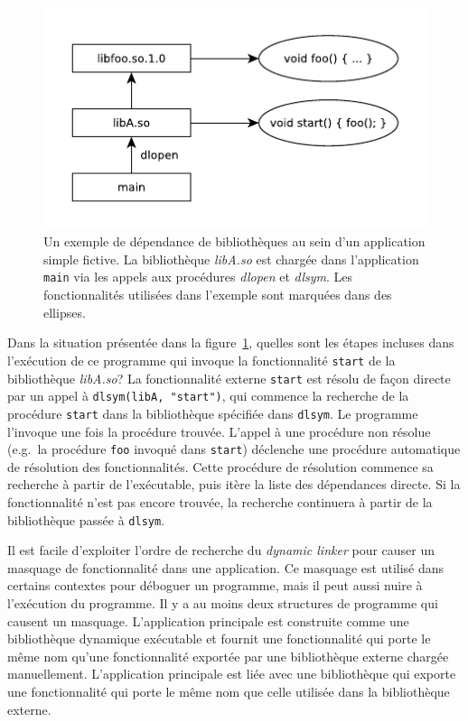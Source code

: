 \begin{center}
    \begin{figure}[ht]
        \includegraphics{figures/libdeps-ex1.pdf}

        \caption{Un exemple de dépendance de bibliothèques au sein d'un
          application simple fictive.  La bibliothèque \textit{libA.so} est
          chargée dans l'application \texttt{main} via les appels aux procédures
          \textit{dlopen} et \textit{dlsym}. Les fonctionnalités utilisées dans
          l'exemple sont marquées dans des ellipses.}

        \label{fig:deps-ex1}
    \end{figure}
\end{center}

Dans la situation présentée dans la figure~\ref{fig:deps-ex1}, quelles sont les étapes incluses
dans l'exécution de ce programme qui invoque la fonctionnalité \texttt{start} de la
bibliothèque \textit{libA.so}? La fonctionnalité externe \texttt{start} est résolu de façon directe par
un appel à \verb|dlsym(libA, "start")|, qui commence la recherche de la procédure \texttt{start} dans
la bibliothèque spécifiée dans \texttt{dlsym}. Le programme l'invoque une fois la procédure trouvée.
L'appel à une procédure non résolue (e.g.\ la procédure \texttt{foo} invoqué dans \texttt{start})
déclenche une procédure automatique de résolution des fonctionnalités. Cette procédure de résolution
commence sa recherche à partir de l'exécutable, puis itère la liste des dépendances directe. Si la
fonctionnalité n'est pas encore trouvée, la recherche continuera à partir de la bibliothèque passée à
\texttt{dlsym}.


Il est facile d'exploiter l'ordre de recherche du \textit{dynamic linker} pour
causer un masquage de fonctionnalité dans une application. Ce masquage est
utilisé dans certains contextes pour déboguer un programme, mais il peut aussi
nuire à l'exécution du programme. Il y a au moins deux structures de programme
qui causent un masquage. L'application principale est construite comme une
bibliothèque dynamique exécutable et fournit une fonctionnalité qui porte le
même nom qu'une fonctionnalité exportée par une bibliothèque externe chargée
manuellement.  L'application principale est liée avec une bibliothèque qui
exporte une fonctionnalité qui porte le même nom que celle utilisée dans la
bibliothèque externe.

